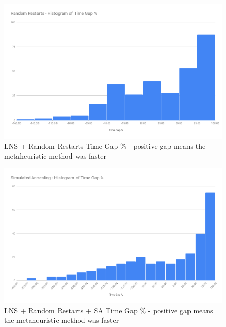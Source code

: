 \begin{figure}[!htbp]
    \centering
    \includegraphics[width=\textwidth]{Figures/Metaheuristics/restarts_time_gap.png}
    \caption{LNS + Random Restarts Time Gap \% - positive gap means the metaheuristic method was faster}
    \label{fig:time_gap_perc_restarts}
\end{figure}

\begin{figure}[!htbp]
    \centering
    \includegraphics[width=\textwidth]{Figures/Metaheuristics/annealing_time_gap.png}
    \caption{LNS + Random Restarts + SA Time Gap \% - positive gap means the metaheuristic method was faster}
    \label{fig:time_gap_perc_annealing}
\end{figure}

